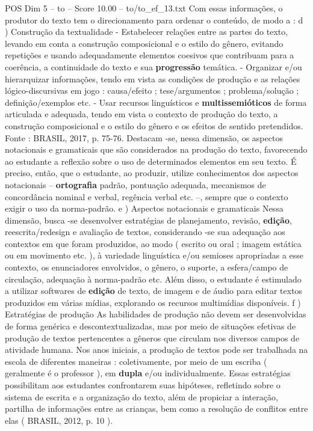 \begin{textsample}{POS Dim 5 – to – Score 10.00 – to/to\_ef\_13.txt}
Com essas informações, o produtor do texto tem o direcionamento para ordenar o conteúdo, de modo a : d ) Construção da textualidade - Estabelecer relações entre as partes do texto, levando em conta a construção composicional e o estilo do gênero, evitando repetições e usando adequadamente elementos coesivos que contribuam para a coerência, a continuidade do texto e sua \textbf{progressão} temática. - Organizar e/ou hierarquizar informações, tendo em vista as condições de produção e as relações lógico-discursivas em jogo : causa/efeito ; tese/argumentos ; problema/solução ; definição/exemplos etc. - Usar recursos linguísticos e \textbf{multissemióticos} de forma articulada e adequada, tendo em vista o contexto de produção do texto, a construção composicional e o estilo do gênero e os efeitos de sentido pretendidos.
Fonte : BRASIL, 2017, p. 75-76.
Destacam -se, nessa dimensão, os aspectos notacionais e gramaticais que são considerados na produção do texto, favorecendo ao estudante a reflexão sobre o uso de determinados elementos em seu texto.
É preciso, então, que o estudante, ao produzir, utilize conhecimentos dos aspectos notacionais – \textbf{ortografia} padrão, pontuação adequada, mecanismos de concordância nominal e verbal, regência verbal etc. –, sempre que o contexto exigir o uso da norma-padrão. e ) Aspectos notacionais e gramaticais Nessa dimensão, busca -se desenvolver estratégias de planejamento, revisão, \textbf{edição}, reescrita/redesign e avaliação de textos, considerando -se sua adequação aos contextos em que foram produzidos, ao modo ( escrito ou oral ; imagem estática ou em movimento etc. ), à variedade linguística e/ou semioses apropriadas a esse contexto, os enunciadores envolvidos, o gênero, o suporte, a esfera/campo de circulação, adequação à norma-padrão etc.
Além disso, o estudante é estimulado a utilizar softwares de \textbf{edição} de texto, de imagem e de áudio para editar textos produzidos em várias mídias, explorando os recursos multimídias disponíveis. f ) Estratégias de produção As habilidades de produção não devem ser desenvolvidas de forma genérica e descontextualizadas, mas por meio de situações efetivas de produção de textos pertencentes a gêneros que circulam nos diversos campos de atividade humana.
Nos anos iniciais, a produção de textos pode ser trabalhada na escola de diferentes maneiras : coletivamente, por meio de um escriba ( geralmente é o professor ), em \textbf{dupla} e/ou individualmente.
Essas estratégias possibilitam aos estudantes confrontarem suas hipóteses, refletindo sobre o sistema de escrita e a organização do texto, além de propiciar a interação, partilha de informações entre as crianças, bem como a resolução de conflitos entre elas ( BRASIL, 2012, p. 10 ).

\end{textsample}
